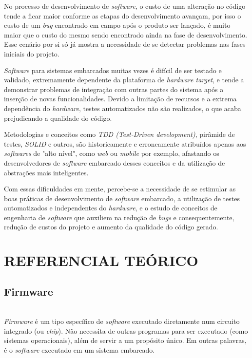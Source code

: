 \documentclass[times, twoside, watermark]{artigo}
\begin{document}
No processo de desenvolvimento de \textit{software}, o custo de uma alteração no 
código tende a ficar maior conforme  as etapas do desenvolvimento avançam, por isso 
o custo de um \textit{bug} encontrado em campo após o produto ser lançado, é muito 
maior que o custo do mesmo sendo encontrado ainda na fase de desenvolvimento\cite{firmwarecost}.
Esse cenário por si só já mostra a necessidade de se detectar problemas nas fases iniciais do projeto.

\textit{Software} para sistemas embarcados muitas vezes é difícil de ser testado e 
validado, extremamente dependente da plataforma de \textit{hardware target}, e 
tende a demonstrar problemas de integração com outras
partes do sistema após a inserção de novas funcionalidades. 
Devido a limitação de recursos e a extrema dependência do \textit{hardware}, testes 
automatizados não são realizados, o que acaba prejudicando a qualidade do código.

Metodologias e conceitos como \textit{TDD (Test-Driven development)}, pirâmide de 
testes, \textit{SOLID} e outros, são historicamente e erroneamente atribuídos apenas
aos \textit{softwares} de "alto nível", como \textit{web} ou 
\textit{mobile} por exemplo, afastando os desenvolvedores de \textit{software} 
embarcado desses conceitos e da utilização de abstrações mais inteligentes. 

Com essas dificuldades em mente, percebe-se a necessidade de se estimular as boas 
práticas de desenvolvimento de \textit{software} embarcado, a utilização de testes 
automatizados e independentes do \textit{hardware}, e o estudo de conceitos de 
engenharia de \textit{software} que auxiliem na
redução de \textit{bugs} e consequentemente, redução de custos do projeto e aumento 
da qualidade do código gerado. \hfill\\




\section{REFERENCIAL TEÓRICO}

\subsection{Firmware}\hfill\\

\textit{Firmware} é um tipo específico de \textit{software} executado diretamente
num circuito integrado (ou \textit{chip}). 
Não necessita de outras programas para ser executado (como sistemas operacionais),
além de servir a um propósito único. 
Em outras palavras, é o \textit{software} executado em um sistema
embarcado\cite{ganssle2004firmware}.
\end{document}
